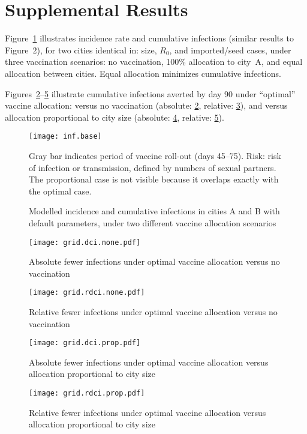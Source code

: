 \section{Supplemental Results}
Figure~\ref{fig:inf.base} illustrates incidence rate and cumulative infections
(similar results to Figure~2),
for two cities identical in: size, $R_0$, and imported/seed cases,
under three vaccination scenarios:
no vaccination, 100\% allocation to city~A, and equal allocation between cities.
Equal allocation minimizes cumulative infections.
\par
Figures~\ref{fig:grid.dci.none}--\ref{fig:grid.rdci.prop} illustrate
cumulative infections averted by day 90 under ``optimal'' vaccine allocation:
versus no vaccination (absolute: \ref{fig:grid.dci.none}, relative: \ref{fig:grid.rdci.none}), and
versus allocation proportional to city size (absolute: \ref{fig:grid.dci.prop}, relative: \ref{fig:grid.rdci.prop}).
\begin{figure}[h]
  \centerline{\texttt{[image: inf.base]}}
  \caption{Modelled \MPXV incidence and cumulative infections
    in cities A and B with default parameters,
    under two different vaccine allocation scenarios}
  \label{fig:inf.base}
  \floatfoot
  Gray bar indicates period of vaccine roll-out (days 45--75).
  Risk: risk of \MPXV infection or transmission, defined by numbers of sexual partners.
  The proportional case is not visible because it overlaps exactly with the optimal case.
\end{figure}
\begin{figure}[h]
  \texttt{[image: grid.dci.none.pdf]}
  \caption{Absolute fewer infections under optimal vaccine allocation
    versus no vaccination}
  \label{fig:grid.dci.none}
  \floatfoot\gridfoot
\end{figure}
\begin{figure}[h]
  \texttt{[image: grid.rdci.none.pdf]}
  \caption{Relative fewer infections under optimal vaccine allocation
    versus no vaccination}
  \label{fig:grid.rdci.none}
  \floatfoot\gridfoot
\end{figure}
\begin{figure}[h]
  \texttt{[image: grid.dci.prop.pdf]}
  \caption{Absolute fewer infections under optimal vaccine allocation
    versus allocation proportional to city size}
  \label{fig:grid.dci.prop}
  \floatfoot\gridfoot
\end{figure}
\begin{figure}[h]
  \texttt{[image: grid.rdci.prop.pdf]}
  \caption{Relative fewer infections under optimal vaccine allocation
    versus allocation proportional to city size}
  \label{fig:grid.rdci.prop}
  \floatfoot\gridfoot
\end{figure}